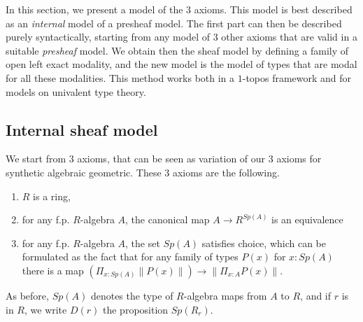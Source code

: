 \newcommand{\inc}{\mathsf{inc}}
\newcommand{\inl}{\mathsf{inl}}
\newcommand{\inr}{\mathsf{inr}}
\newcommand{\idd}{\mathsf{id}}
\newcommand{\II}{\mathbf{I}}
\newcommand{\nats}{\mathbf{N}}
\newcommand\norm[1]{\left\lVert #1 \right\rVert}


\newcommand{\Gm}{\mathsf{G_m}}
\newcommand{\ext}{\mathsf{ext}}
\newcommand{\patch}{\mathsf{patch}}
\newcommand{\cov}{\mathsf{cov}}
\newcommand{\isSheaf}{\mathsf{isSheaf}}
\newcommand{\isIso}{\mathsf{isIso}}
\newcommand{\Fib}{\mathsf{Fib}}

\newcommand{\Typp}{\mathsf{Type}}
\newcommand{\Elem}{\mathsf{Elem}}
\newcommand{\Cont}{\mathsf{Cont}}

\newcommand{\BB}{\mathcal{B}}
\newcommand{\CC}{\mathcal{C}}
\newcommand{\UU}{\mathcal{U}}
\newcommand{\WW}{\mathcal{W}}
\newcommand{\VV}{\mathcal{V}}

In this section, we present a model of the 3 axioms. This model is best described as an \emph{internal} model
of a presheaf model. The first part can then be described purely syntactically, starting from any model
of 3 other axioms that are valid in a suitable \emph{presheaf} model. We obtain then the sheaf model by defining
a family of open left exact modality, and the new model is the model of types that are modal for all these modalities.
This method works both in a $1$-topos framework and for models on univalent type theory.

\subsection{Internal sheaf model}

We start from 3 axioms, that can be seen as variation of our 3 axioms for synthetic algebraic geometric.
These 3 axioms are the following.

\begin{enumerate}
\item $R$ is a ring,
\item for any f.p. $R$-algebra $A$, the canonical map $A\rightarrow R^{Sp(A)}$ is an equivalence
\item for any f.p. $R$-algebra $A$, the set $Sp(A)$ satisfies choice, which can be formulated as
  the fact that for any family of types $P(x)$ for $x:Sp(A)$ there is a map
  $(\Pi_{x:Sp(A)}\norm{P(x)})\rightarrow \norm{\Pi_{x:A}P(x)}$.
\end{enumerate}

As before, $Sp(A)$ denotes the type of $R$-algebra maps from $A$ to $R$, and
if $r$ is in $R$, we write $D(r)$ the proposition $Sp(R_r)$.

